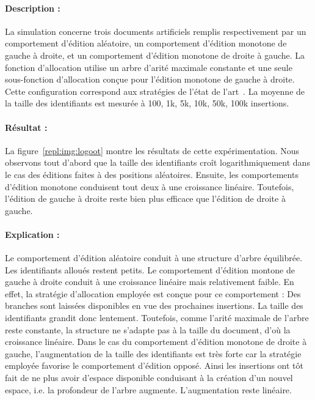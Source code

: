 \paragraph{Description :} La simulation concerne trois documents artificiels
remplis respectivement par un comportement d'édition aléatoire, un comportement
d'édition monotone de gauche à droite, et un comportement d'édition monotone de
droite à gauche. La fonction d'allocation utilise un arbre d'arité maximale
constante et une seule sous-fonction d'allocation conçue pour l'édition monotone
de gauche à droite. Cette configuration correspond aux stratégies de l'état de
l'art~\cite{preguica2009commutative, weiss2009logoot}.  La moyenne de la taille
des identifiants est mesurée à 100, 1k, 5k, 10k, 50k, 100k insertions.

\paragraph{Résultat :} La figure~\ref{repl:img:logoot} montre les résultats de
cette expérimentation. Nous observons tout d'abord que la taille des
identifiants croît logarithmiquement dans le cas des éditions faites à des
positions aléatoires. Ensuite, les comportements d'édition monotone conduisent
tout deux à une croissance linéaire. Toutefois, l'édition de gauche à droite
reste bien plus efficace que l'édition de droite à gauche.

\paragraph{Explication :} Le comportement d'édition aléatoire conduit à une
structure d'arbre équilibrée. Les identifiants alloués restent petits. Le
comportement d'édition montone de gauche à droite conduit à une croissance
linéaire mais relativement faible. En effet, la stratégie d'allocation employée
est conçue pour ce comportement : Des branches sont laissées disponibles en vue
des prochaines insertions. La taille des identifiants grandit donc
lentement. Toutefois, comme l'arité maximale de l'arbre reste constante, la
structure ne s'adapte pas à la taille du document, d'où la croissance
linéaire. Dans le cas du comportement d'édition monotone de droite à gauche,
l'augmentation de la taille des identifiants est très forte car la stratégie
employée favorise le comportement d'édition opposé. Ainsi les insertions ont tôt
fait de ne plus avoir d'espace disponible conduisant à la création d'un nouvel
espace, i.e. la profondeur de l'arbre augmente. L'augmentation reste linéaire.

